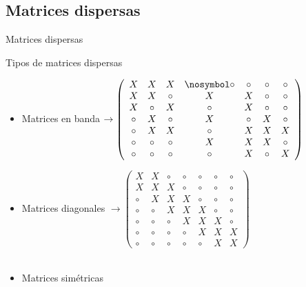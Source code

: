 \documentclass [8pt] {beamer}
\begin{document}
    \subsection{Matrices dispersas}
        \begin{frame}{Matrices dispersas}
            \begin{block} {Tipos de matrices dispersas}
                \begin{itemize}
                    \item Matrices en banda $\rightarrow \left( \begin{array}{ccccccc}
                    X & X & X & \nosymbol \circ & \circ & \circ & \circ\\
                    X & X & \circ & X & X & \circ & \circ\\ 
                    X & \circ & X & \circ & X & \circ & \circ\\
                    \circ & X & \circ & X & \circ & X & \circ\\
                    \circ & X & X & \circ & X & X & X\\
                    \circ & \circ & \circ & X & X & X & \circ\\
                    \circ & \circ & \circ & \circ & X & \circ & X
                    \end{array} \right)$
                    \item Matrices diagonales $\rightarrow \left( \begin{array}{ccccccc}
                    X & X & \circ & \circ & \circ & \circ & \circ\\
                    X & X & X & \circ & \circ & \circ & \circ\\
                    \circ & X & X & X & \circ & \circ & \circ\\
                    \circ & \circ & X & X & X & \circ & \circ\\
                    \circ & \circ & \circ & X & X & X & \circ\\
                    \circ & \circ & \circ & \circ & X & X & X\\
                    \circ & \circ & \circ & \circ & \circ & X & X
                    \end{array} \right)$ \\ \ \\
                    \item Matrices simétricas
                \end{itemize}
            \end{block}
        \end{frame}
\end{document}
